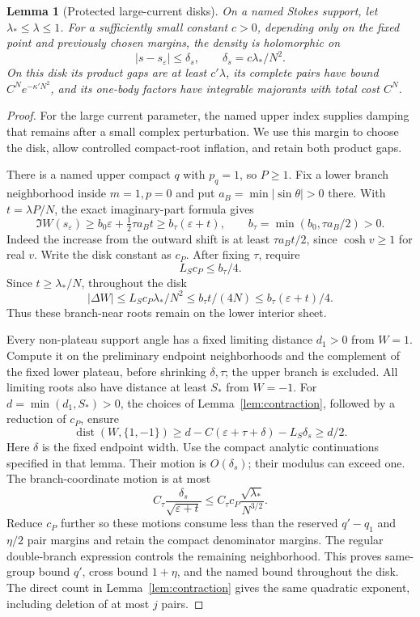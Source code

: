 \documentclass[11pt]{article}
\numberwithin{equation}{section}
\newtheorem{lemma}[theorem]{Lemma}
\theoremstyle{definition}
\newcommand{\eps}{\varepsilon}
\begin{document}
\begin{lemma}[Protected large-current disks]\label{lem:protected}
On a named Stokes support, let \(\lambda_*\le\lambda\le1\).
For a sufficiently small constant \(c>0\), depending only on
the fixed point and previously chosen margins, the density is
holomorphic on
\[
 |s-s_\eps|\le\delta_s,\qquad \delta_s=c\lambda_*/N^2 .
\]
On this disk its product gaps are at least \(c'\lambda\),
its complete pairs have bound \(C^Ne^{-\kappa' N^2}\), and its
one-body factors have integrable majorants with total cost \(C^N\).
\end{lemma}
\begin{proof}
For the large current parameter, the named upper index supplies damping that remains after a small complex perturbation. We use this margin to choose the disk, allow controlled compact-root inflation, and retain both product gaps.

There is a named upper compact \(q\) with \(p_q=1\), so
\(P\ge1\). Fix a lower branch neighborhood inside \(m=1,p=0\)
and put \(a_B=\min|\sin\theta|>0\) there. With
\(t=\lambda P/N\), the exact imaginary-part formula gives
\[
 \Im W(s_\eps)\ge b_0\eps+\tfrac12\tau a_Bt
 \ge b_\tau(\eps+t),\qquad
 b_\tau=\min(b_0,\tau a_B/2)>0.
\]
Indeed the increase from the outward shift is at least
\(\tau a_Bt/2\), since \(\cosh v\ge1\) for real \(v\).
Write the disk constant as \(c_P\). After fixing \(\tau\), require
\[
 L_Sc_P\le b_\tau/4.
\]
Since \(t\ge\lambda_*/N\), throughout the disk
\[
 |\Delta W|\le L_Sc_P\lambda_*/N^2
 \le b_\tau t/(4N)\le b_\tau(\eps+t)/4.
\]
Thus these branch-near roots remain on the lower interior sheet.

Every non-plateau support angle has a fixed limiting distance
\(d_1>0\) from \(W=1\). Compute it on the preliminary endpoint
neighborhoods and the complement of the fixed lower plateau,
before shrinking \(\delta,\tau\); the upper branch is excluded.
All limiting
roots also have distance at least \(S_*\) from \(W=-1\).
For \(d=\min(d_1,S_*)>0\), the choices of
Lemma~\ref{lem:contraction}, followed by a reduction of \(c_P\),
ensure
\[
 \operatorname{dist}(W,\{1,-1\})
 \ge d-C(\eps+\tau+\delta)-L_S\delta_s\ge d/2.
\]
Here \(\delta\) is the fixed endpoint width.
Use the compact analytic continuations specified in that lemma.
Their motion is \(O(\delta_s)\); their modulus can exceed one.
The branch-coordinate motion is at most
\[
 C_\tau\frac{\delta_s}{\sqrt{\eps+t}}
 \le C_\tau c_P\frac{\sqrt{\lambda_*}}{N^{3/2}}.
\]
Reduce \(c_P\) further so these motions consume less than
the reserved \(q'-q_1\) and \(\eta/2\) pair margins and retain
the compact denominator margins. The regular double-branch
expression controls the remaining neighborhood. This proves
same-group bound \(q'\), cross bound \(1+\eta\), and the named
bound throughout the disk.
The direct count in Lemma~\ref{lem:contraction} gives the same
quadratic exponent, including deletion of at most \(j\) pairs.


\end{proof}
\end{document}
